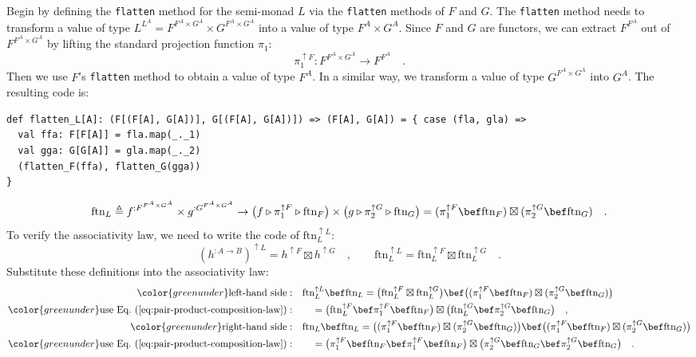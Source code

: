 Begin by defining the \lstinline!flatten! method for the semi-monad
$L$ via the \lstinline!flatten! methods of $F$ and $G$. The \lstinline!flatten!
method needs to transform a value of type $L^{L^{A}}=F^{F^{A}\times G^{A}}\times G^{F^{A}\times G^{A}}$
into a value of type $F^{A}\times G^{A}$. Since $F$ and $G$ are
functors, we can extract $F^{F^{A}}$ out of $F^{F^{A}\times G^{A}}$
by lifting the standard projection function $\pi_{1}$:
\[
\pi_{1}^{\uparrow F}:F^{F^{A}\times G^{A}}\rightarrow F^{F^{A}}\quad.
\]
Then we use $F$\textsf{'}s \lstinline!flatten! method to obtain a value of
type $F^{A}$. In a similar way, we transform a value of type $G^{F^{A}\times G^{A}}$
into $G^{A}$. The resulting code is:
\begin{lstlisting}
def flatten_L[A]: (F[(F[A], G[A])], G[(F[A], G[A])]) => (F[A], G[A]) = { case (fla, gla) =>
  val ffa: F[F[A]] = fla.map(_._1)
  val gga: G[G[A]] = gla.map(_._2)
  (flatten_F(ffa), flatten_G(gga))
}
\end{lstlisting}
\begin{equation}
\text{ftn}_{L}\triangleq f^{:F^{F^{A}\times G^{A}}}\times g^{:G^{F^{A}\times G^{A}}}\rightarrow\big(f\triangleright\pi_{1}^{\uparrow F}\triangleright\text{ftn}_{F}\big)\times\big(g\triangleright\pi_{2}^{\uparrow G}\triangleright\text{ftn}_{G}\big)=(\pi_{1}^{\uparrow F}\bef\text{ftn}_{F})\boxtimes(\pi_{2}^{\uparrow G}\bef\text{ftn}_{G})\quad.\label{eq:monad-product-flatten-def-ftn}
\end{equation}
To verify the associativity law, we need to write the code of $\text{ftn}_{L}^{\uparrow L}$:
\[
(h^{:A\rightarrow B})^{\uparrow L}=h^{\uparrow F}\boxtimes h^{\uparrow G}\quad,\quad\quad\text{ftn}_{L}^{\uparrow L}=\text{ftn}_{L}^{\uparrow F}\boxtimes\text{ftn}_{L}^{\uparrow G}\quad.
\]
Substitute these definitions into the associativity law:
\begin{align*}
{\color{greenunder}\text{left-hand side}:}\quad & \text{ftn}_{L}^{\uparrow L}\bef\text{ftn}_{L}=\big(\text{ftn}_{L}^{\uparrow F}\boxtimes\text{ftn}_{L}^{\uparrow G}\big)\bef\big((\pi_{1}^{\uparrow F}\bef\text{ftn}_{F})\boxtimes(\pi_{2}^{\uparrow G}\bef\text{ftn}_{G})\big)\\
{\color{greenunder}\text{use Eq.~(\ref{eq:pair-product-composition-law})}:}\quad & \quad=\big(\text{ftn}_{L}^{\uparrow F}\bef\pi_{1}^{\uparrow F}\bef\text{ftn}_{F}\big)\boxtimes\big(\text{ftn}_{L}^{\uparrow G}\bef\pi_{2}^{\uparrow G}\bef\text{ftn}_{G}\big)\quad,\\
{\color{greenunder}\text{right-hand side}:}\quad & \text{ftn}_{L}\bef\text{ftn}_{L}=\big((\pi_{1}^{\uparrow F}\bef\text{ftn}_{F})\boxtimes(\pi_{2}^{\uparrow G}\bef\text{ftn}_{G})\big)\bef\big((\pi_{1}^{\uparrow F}\bef\text{ftn}_{F})\boxtimes(\pi_{2}^{\uparrow G}\bef\text{ftn}_{G})\big)\\
{\color{greenunder}\text{use Eq.~(\ref{eq:pair-product-composition-law})}:}\quad & \quad=\big(\pi_{1}^{\uparrow F}\bef\text{ftn}_{F}\bef\pi_{1}^{\uparrow F}\bef\text{ftn}_{F}\big)\boxtimes\big(\pi_{2}^{\uparrow G}\bef\text{ftn}_{G}\bef\pi_{2}^{\uparrow G}\bef\text{ftn}_{G}\big)\quad.
\end{align*}
